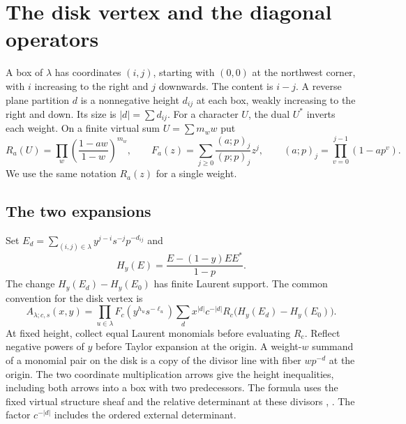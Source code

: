 \section{The disk vertex and the diagonal operators}\label{sec:disk}

A box of $\lambda$ has coordinates $(i,j)$, starting with $(0,0)$ at the northwest corner, with $i$ increasing to the right and $j$ downwards. The content is $i-j$. A reverse plane partition $d$ is a nonnegative height $d_{ij}$ at each box, weakly increasing to the right and down. Its size is $|d|=\sum d_{ij}$. For a character $U$, the dual $U^*$ inverts each weight. On a finite virtual sum $U=\sum m_w w$ put
\[
 R_a(U)=\prod_w\left(\frac{1-aw}{1-w}\right)^{m_w},
 \qquad F_a(z)=\sum_{j\ge0}\frac{(a;p)_j}{(p;p)_j}z^j,
 \qquad (a;p)_j=\prod_{v=0}^{j-1}(1-ap^v).
\]
We use the same notation $R_a(z)$ for a single weight.

\subsection{The two expansions}
Set $E_d=\sum_{(i,j)\in\lambda} y^{j-i}s^{-j}p^{-d_{ij}}$ and
\[
       H_y(E)=\frac{E-(1-y)EE^*}{1-p}.
\]
The change $H_y(E_d)-H_y(E_0)$ has finite Laurent support. The common convention for the disk vertex is
\begin{equation}\label{eq:A}
 A_{\lambda;c,s}(x,y)=
 \prod_{u\in\lambda}F_c(y^{h_u}s^{-\ell_u})
 \sum_d x^{|d|}c^{-|d|}
 R_c\big(H_y(E_d)-H_y(E_0)\big).
\end{equation}
At fixed height, collect equal Laurent monomials before evaluating $R_c$. Reflect negative powers of $y$ before Taylor expansion at the origin. A weight-$w$ summand of a monomial pair on the disk is a copy of the divisor line with fiber $wp^{-d}$ at the origin. The two coordinate multiplication arrows give the height inequalities, including both arrows into a box with two predecessors. The formula uses the fixed virtual structure sheaf and the relative determinant at these divisors \cite[Theorem~6.1]{Mon}, \cite[\S5]{W1}. The factor $c^{-|d|}$ includes the ordered external determinant.

